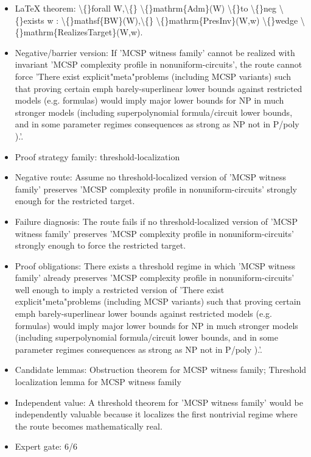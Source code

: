 \documentclass[11pt]{article}
\begin{document}
\begin{itemize}
\item LaTeX theorem: \textbackslash\{\}forall W,\textbackslash\{\} \textbackslash\{\}mathrm\{Adm\}(W) \textbackslash\{\}to \textbackslash\{\}neg \textbackslash\{\}exists w : \textbackslash\{\}mathsf\{BW\}(W),\textbackslash\{\} \textbackslash\{\}mathrm\{PresInv\}(W,w) \textbackslash\{\}wedge \textbackslash\{\}mathrm\{RealizesTarget\}(W,w).
\item Negative/barrier version: If 'MCSP witness family' cannot be realized with invariant 'MCSP complexity profile in nonuniform-circuits', the route cannot force 'There exist explicit"meta"problems (including MCSP variants) such that proving certain emph barely-superlinear lower bounds against restricted models (e.g. formulas) would imply major lower bounds for NP in much stronger models (including superpolynomial formula/circuit lower bounds, and in some parameter regimes consequences as strong as NP not in P/poly ).'.
\item Proof strategy family: threshold-localization
\item Negative route: Assume no threshold-localized version of 'MCSP witness family' preserves 'MCSP complexity profile in nonuniform-circuits' strongly enough for the restricted target.
\item Failure diagnosis: The route fails if no threshold-localized version of 'MCSP witness family' preserves 'MCSP complexity profile in nonuniform-circuits' strongly enough to force the restricted target.
\item Proof obligations: There exists a threshold regime in which 'MCSP witness family' already preserves 'MCSP complexity profile in nonuniform-circuits' well enough to imply a restricted version of 'There exist explicit"meta"problems (including MCSP variants) such that proving certain emph barely-superlinear lower bounds against restricted models (e.g. formulas) would imply major lower bounds for NP in much stronger models (including superpolynomial formula/circuit lower bounds, and in some parameter regimes consequences as strong as NP not in P/poly ).'.
\item Candidate lemmas: Obstruction theorem for MCSP witness family; Threshold localization lemma for MCSP witness family
\item Independent value: A threshold theorem for 'MCSP witness family' would be independently valuable because it localizes the first nontrivial regime where the route becomes mathematically real.
\item Expert gate: 6/6
\end{itemize}
\end{document}
